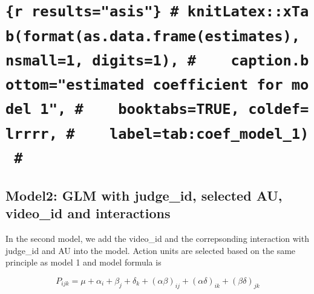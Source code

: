 \documentclass{monashthesis}
\begin{document}
\hypertarget{r-resultsasis-knitlatexxtabformatas.data.frameestimates-nsmall1-digits1-caption.bottomestimated-coefficient-for-model-1-booktabstrue-coldeflrrrr-labeltabcoef_model_1}{%
\chapter{\texorpdfstring{\texttt{\{r\ results="asis"\}\ \#\ knitLatex::xTab(format(as.data.frame(estimates),\ nsmall=1,\ digits=1),\ \#\ \ \ \ caption.bottom="estimated\ coefficient\ for\ model\ 1",\ \#\ \ \ \ booktabs=TRUE,\ coldef=\textquotesingle{}lrrrr\textquotesingle{},\ \#\ \ \ \ label=\textquotesingle{}tab:coef\_model\_1\textquotesingle{})\ \#}}{\{r results="asis"\} \# knitLatex::xTab(format(as.data.frame(estimates), nsmall=1, digits=1), \#    caption.bottom="estimated coefficient for model 1", \#    booktabs=TRUE, coldef='lrrrr', \#    label='tab:coef\_model\_1') \#}}\label{r-resultsasis-knitlatexxtabformatas.data.frameestimates-nsmall1-digits1-caption.bottomestimated-coefficient-for-model-1-booktabstrue-coldeflrrrr-labeltabcoef_model_1}}

\hypertarget{model2-glm-with-judge_id-selected-au-video_id-and-interactions}{%
\section{Model2: GLM with judge\_id, selected AU, video\_id and interactions}\label{model2-glm-with-judge_id-selected-au-video_id-and-interactions}}

In the second model, we add the video\_id and the correpsonding interaction with judge\_id and AU into the model. Action units are selected based on the same principle as model 1 and model formula is

\[P_{ijk} = \mu + \alpha_i + \beta_j +\delta_k + (\alpha\beta)_{ij}+(\alpha\delta)_{ik} + (\beta\delta)_{jk}\]
\end{document}
